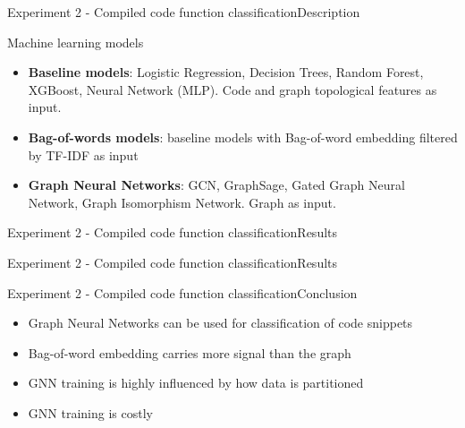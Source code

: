 \documentclass[xcolor=table]{beamer}
\begin{document}
\begin{frame}{Experiment 2 - Compiled code function classification}{Description}

Machine learning models
\begin{itemize}
    \item \textbf{Baseline models}: Logistic Regression, Decision Trees, Random Forest, XGBoost, Neural Network (MLP). Code and graph topological features as input.

    \item \textbf{Bag-of-words models}: baseline models with Bag-of-word embedding filtered by TF-IDF as input

    \item \textbf{Graph Neural Networks}: GCN, GraphSage, Gated Graph Neural Network, Graph Isomorphism Network. Graph as input.
\end{itemize}

\end{frame}


\begin{frame}{Experiment 2 - Compiled code function classification}{Results}





\end{frame}


\begin{frame}{Experiment 2 - Compiled code function classification}{Results}


\end{frame}

\begin{frame}{Experiment 2 - Compiled code function classification}{Conclusion}


\begin{itemize}
    \item Graph Neural Networks can be used for classification of code snippets
    \item Bag-of-word embedding carries more signal than the graph
    \item GNN training is highly influenced by how data is partitioned
    \item GNN training is costly
\end{itemize}

\end{frame}
\end{document}
